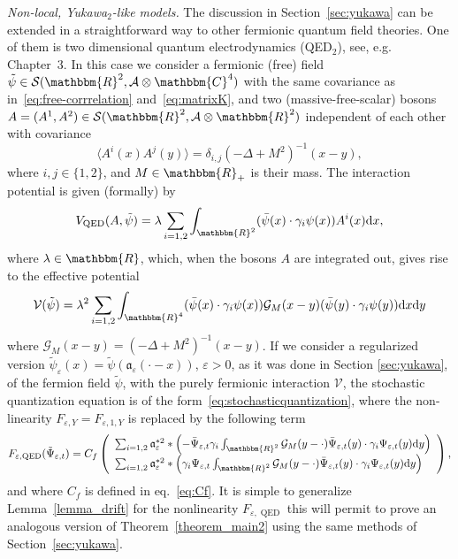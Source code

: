 \documentclass[11pt]{article}
\newcommand{\asterisk}{\mathord{*}}
\newcommand{\mathd}{\mathrm{d}}
\newcommand{\tmop}[1]{\ensuremath{\operatorname{#1}}}
\newcommand{\tmtextit}[1]{{\itshape{#1}}}
\begin{document}
\tmtextit{Non-local, Yukawa$_2$-like models.} The discussion in
Section~\ref{sec:yukawa} can be extended in a straightforward way to other
fermionic quantum field theories. One of them is two dimensional quantum
electrodynamics (QED$_2$), see,
e.g.~{\cite{mastropietro_non-perturbative_2008}} Chapter~3. In this case we
consider a fermionic (free) field $\tilde{\psi} \in \mathcal{S}
(\mathbbm{R}^2, \mathcal{A} \otimes \mathbbm{C}^4)$ with the same covariance as
in~{\eqref{eq:free-corrrelation}} and~{\eqref{eq:matrixK}}, and two
(massive-free-scalar) bosons $A = (A^1, A^2) \in \mathcal{S} (\mathbbm{R}^2,
\mathcal{A} \otimes \mathbbm{R}^2)$ independent of each other with covariance
\[ \langle A^i (x) A^j (y) \rangle = \delta_{i, j} (- \Delta + M^2)^{- 1} (x
   - y), \]
where $i, j \in \{ 1, 2 \}$, and $M \in \mathbbm{R}_+$ is their mass. The
interaction potential is given (formally) by
\[ V_{\tmop{QED}} (A, \tilde{\psi}) = \lambda \sum_{i = 1, 2}
   \int_{\mathbbm{R}^2}  (\bar{\psi} (x) \cdot \gamma_i \psi (x)) A^i (x)
   \mathd x, \]
where $\lambda \in \mathbbm{R}$, which, when the bosons $A$ are integrated out,
gives rise to the effective potential
\begin{equation}
  \mathcal{V} (\tilde{\psi}) = \lambda^2 \sum_{i = 1, 2} \int_{\mathbbm{R}^4}
  (\bar{\psi} (x) \cdot \gamma_i \psi (x)) \mathcal{G}_M (x - y) (\bar{\psi}
  (y) \cdot \gamma_i \psi (y)) \mathd x \mathd y \label{eq:QED1}
\end{equation}
where $\mathcal{G}_M (x - y) = (- \Delta + M^2)^{- 1} (x - y)$. If we consider
a regularized version $\tilde{\psi}_{\varepsilon} (x) = \tilde{\psi}
(\mathfrak{a}_{\varepsilon} (\cdot - x))$, $\varepsilon > 0$, as it was done
in Section \ref{sec:yukawa}, of the fermion field $\tilde{\psi}$, with the
purely fermionic interaction $\mathcal{V}$, the stochastic quantization
equation is of the form~{\eqref{eq:stochasticquantization}}, where the
non-linearity $F_{\varepsilon, Y} = F_{\varepsilon, 1, Y}$ is replaced by the
following term
\[ F_{\varepsilon, \tmop{QED}} (\tilde{\Psi}_{\varepsilon, t}) = C_f \left(
   \begin{array}{l}
     \sum_{i = 1, 2} \mathfrak{a}_{\varepsilon}^{\asterisk 2} \ast \left( -
     \bar{\Psi}_{\varepsilon, t} \gamma_i \int_{\mathbbm{R}^2} \mathcal{G}_M (y
     - \cdot) \bar{\Psi}_{\varepsilon, t} (y) \cdot \gamma_i
     \Psi_{\varepsilon, t} (y) \mathd y \right)\\
     \sum_{i = 1, 2} \mathfrak{a}_{\varepsilon}^{\asterisk 2} \ast \left(
     \gamma_i \Psi_{\varepsilon, t} \int_{\mathbbm{R}^2} \mathcal{G}_M (y -
     \cdot) \bar{\Psi}_{\varepsilon, t} (y) \cdot \gamma_i \Psi_{\varepsilon,
     t} (y) \mathd y \right)
   \end{array} \right), \]
and where $C_f$ is defined in eq.~{\eqref{eq:Cf}}. It is simple to generalize
Lemma~\ref{lemma_drift} for the nonlinearity $F_{\varepsilon, \tmop{QED}}$
this will permit to prove an analogous version of Theorem~\ref{theorem_main2}
using the same methods of Section~\ref{sec:yukawa}.
\end{document}
